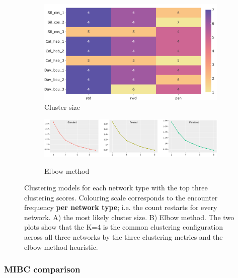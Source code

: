\begin{figure}[!t]
    \centering
    \begin{subfigure}[!t]{0.8\textwidth}
        \includegraphics[width=\textwidth,keepaspectratio]{Sections/Network_I/Resources/P0/clustering/top3_cs_size_p0_tum4K_50TF_v3.png}
        \caption{Cluster size}
        \label{fig:N_I:p0_metr_size}
    \end{subfigure}
    \begin{subfigure}[!t]{1.0\textwidth}
        \includegraphics[width=\textwidth, keepaspectratio]{Sections/Network_I/Resources/P0/clustering/p0_elbowMethod_4K_v3.png}
        \label{fig:N_I:p0_elbow_method}
        \caption{Elbow method}
    \end{subfigure}
    \caption[Choosing $K$ for MEVs for P0 network]{Clustering models for each network type with the top three clustering scores. Colouring scale corresponds to the encounter frequency \textbf{per network type}; i.e. the count restarts for every network. A) the most likely cluster size. B) Elbow method. The two plots show that the K=4 is the common clustering configuration across all three networks by the three clustering metrics and the elbow method heuristic. }
    \label{fig:N_I:p0_top_3_metrics_II}
\end{figure}

\subsubsection*{MIBC comparison}


